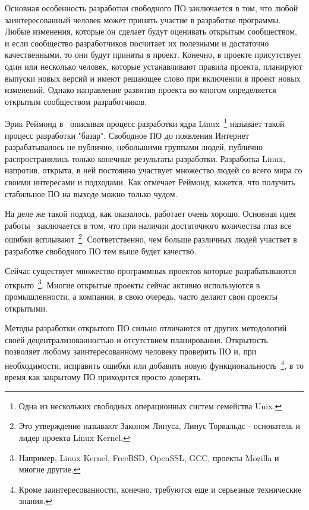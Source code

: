 Основная особенность разработки свободного ПО заключается в том, что любой заинтересованный человек может принять участие в разработке программы. Любые изменения, которые он сделает будут оценивать открытым сообществом, и если сообщество разработчиков посчитает их полезными и достаточно качественными, то они будут приняты в проект. Конечно, в проекте присутствует один или несколько человек, которые устанавливают правила проекта, планируют выпуски новых версий и имеют решающее слово при включении в проект новых изменений. Однако направление развития проекта во многом определяется открытым сообществом разработчиков.

Эрик Реймонд в~\cite{Raymond:1999:CB} описывая процесс разработки ядра Linux~\footnote{Одна из нескольких свободных операционных систем семейства Unix.} называет такой процесс разработки "базар". Свободное ПО до появления Интернет разрабатывалось не публично, небольшими группами людей, публично распространялись только конечные результаты разработки. Разработка Linux, напротив, открыта, в ней постоянно участвует множество людей со всего мира со своими интересами и подходами. Как отмечает Реймонд, кажется, что получить стабильное ПО на выходе можно только чудом.

На деле же такой подход, как оказалось, работает очень хорошо. Основная идея работы~\cite{Raymond:1999:CB} заключается в том, что при наличии достаточного количества глаз все ошибки всплывают~\footnote{Это утверждение называют Законом Линуса, Линус Торвальдс - основатель и лидер проекта Linux Kernel.}. Соответственно, чем больше различных людей участвет в разработке свободного ПО тем выше будет качество.

Сейчас существует множество программных проектов которые разрабатываются открыто~\footnote{Например, Linux Kernel, FreeBSD, OpenSSL, GCC, проекты Mozilla и многие другие.}. Многие открытые проекты сейчас активно используются в промышленности, а компании, в свою очередь, часто делают свои проекты открытыми.

Методы разработки открытого ПО сильно отличаются от других методологий своей децентрализованностью и отсутствием планирования. Открытость позволяет любому заинтересованному человеку проверить ПО и, при необходимости, исправить ошибки или добавить новую функциональность~\footnote{Кроме заинтересованности, конечно, требуются еще и серьезные технические знания.}, в то время как закрытому ПО приходится просто доверять.
